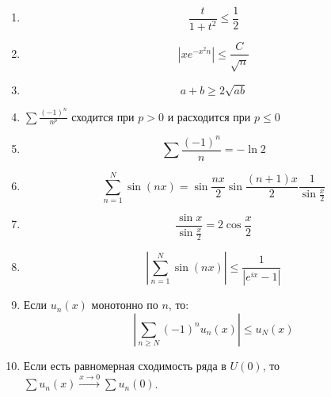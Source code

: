 \begin{enumerate}
    \item \[\frac{t}{1 + t^2} \leq \frac{1}{2}\]
    \item \[\left|xe^{ - x^2n}\right| \leq \frac{C}{\sqrt{n}}\]
    \item \[a + b \geq 2\sqrt{ab}\]
    \item \(\sum \frac{( - 1)^n}{n^p} \) сходится при \(p > 0\) и расходится при \(p \leq 0\)
    \item \[\sum \frac{( - 1)^n}{n} = -\ln 2\]
    \item \[\sum_{n = 1}^N \sin (nx) = \sin \frac{nx}{2} \sin \frac{(n + 1)x}{2} \frac{1}{\sin \frac{x}{2}}\]
    \item \[\frac{\sin x}{\sin \frac{x}{2}} = 2\cos \frac{x}{2}\]
    \item \[\left|\sum_{n = 1}^N \sin (nx)\right| \leq \frac{1}{|e^{ix} - 1|}\]
    \item Если \(u_n(x)\) монотонно по \(n\), то:
          \[\left|\sum_{n \geq N} ( - 1)^n u_n(x) \right| \leq u_N(x)\]
    \item Если есть равномерная сходимость ряда в \(U(0)\), то \(\sum u_n(x) \xrightarrow{x\to 0} \sum u_n(0)\).
\end{enumerate}

